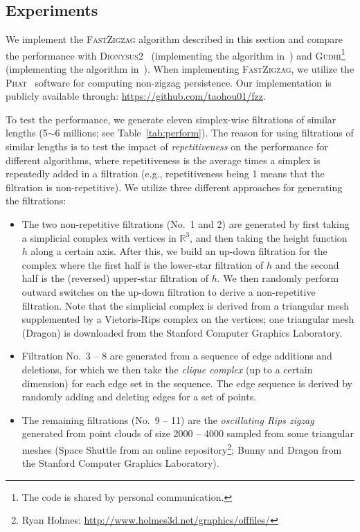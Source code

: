 \documentclass[letterpaper,11pt]{article}
\theoremstyle{mythmstyle}
\theoremstyle{mydefstyle}
\theoremstyle{plain}
\theoremstyle{definition}
\newcommand{\Real}{\mathbb{R}}
\newcommand{\<}[1]{\langle #1\rangle}
\newcommand{\Phat}{\textsc{Phat}}
\newcommand{\Gudhi}{\textsc{Gudhi}}
\newcommand{\Dionysustwo}{\textsc{Dionysus2}}
\begin{document}
\subsection{Experiments}
\label{sec:exp}
We implement the \textsc{FastZigzag} algorithm 
described in this section and compare the performance
with \Dionysustwo{}~\cite{Dionysus2} 
(implementing the algorithm in~\cite{carlsson2009zigzag-realvalue})
and \Gudhi{}\footnote{The code is shared by personal communication.}~\cite{gudhi:urm}
(implementing the algorithm in~\cite{maria2014zigzag,maria2019discrete}).
When implementing \textsc{FastZigzag}, we utilize the \Phat{}~\cite{bauer2017phat} 
software for computing non-zigzag persistence.
Our implementation is publicly available through: 
\url{https://github.com/taohou01/fzz}.

To test the performance,
we generate eleven
simplex-wise filtrations of similar lengths (5$\sim$6 millions; see Table~\ref{tab:perform}).
The reason for using filtrations of similar lengths
is to test the impact of \emph{repetitiveness} on the performance
for different algorithms, where repetitiveness is the average times
a simplex is repeatedly added in a filtration 
(e.g., repetitiveness being 1 means that
the filtration is non-repetitive).
We utilize three different approaches for generating the filtrations:
\begin{itemize}
    \item
The two non-repetitive filtrations (No.\ 1 and 2) 
are generated by first taking a simplicial complex with vertices in $\Real^3$,
and then taking the height function $h$ along a certain axis.
After this, we build an up-down filtration for the complex 
where the first half is the lower-star filtration of $h$ %
and the second half is the (reversed) upper-star filtration of $h$. %
We then randomly perform outward switches on the up-down filtration
to derive a non-repetitive filtration.
Note that the simplicial complex is derived from a triangular mesh 
supplemented by a Vietoris-Rips complex on the vertices;
one triangular mesh (Dragon) is downloaded from 
the Stanford Computer Graphics Laboratory.

    \item
Filtration No.\ 3 -- 8 are generated from a sequence of edge additions
and deletions, for which we then take the \emph{clique complex} 
(up to a certain dimension)
for each edge set in the sequence.
The edge sequence is derived by randomly adding and deleting edges
for a set of points.

    \item 
The remaining filtrations (No.\ 9 -- 11) are the \emph{oscillating Rips zigzag}~\cite{oudot2015zigzag}
generated from point clouds of size 2000 -- 4000 sampled from some triangular meshes
(Space Shuttle from an online repository\footnote{Ryan Holmes: \url{http://www.holmes3d.net/graphics/offfiles/}};
Bunny and Dragon from the Stanford Computer Graphics Laboratory).
\end{itemize}
\end{document}
